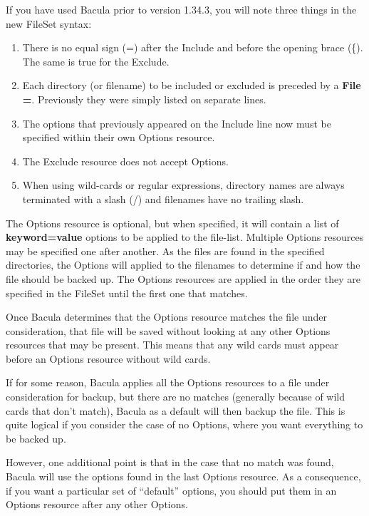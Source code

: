 If you have used Bacula prior to version 1.34.3, you will note three things in
the new FileSet syntax: 

\begin{enumerate}
\item There is no equal sign (=) after the Include and before the opening
   brace (\{). The same is true for the Exclude. 
\item Each directory (or filename) to be included or excluded is preceded by a {\bf File
   =}.  Previously they were simply listed on separate lines. 
\item The options that previously appeared on the Include line now must be
   specified within their own Options resource.
\item The Exclude resource does not accept Options. 
\item When using wild-cards or regular expressions, directory names are
   always terminated with a slash (/) and filenames have no trailing slash.
\end{enumerate}

The Options resource is optional, but when specified, it will contain a
list of {\bf keyword=value} options to be applied to the file-list.
Multiple Options resources may be specified one after another.  As the
files are found in the specified directories, the Options will applied to
the filenames to determine if and how the file should be backed up.  The
Options resources are applied in the order they are specified in the
FileSet until the first one that matches.  

Once Bacula determines that the Options resource matches the file under
consideration, that file will be saved without looking at any other Options
resources that may be present.  This means that any wild cards must appear
before an Options resource without wild cards.

If for some reason, Bacula applies all the Options resources to a file
under consideration for backup, but there are no matches (generally because
of wild cards that don't match), Bacula as a default will then backup the
file.  This is quite logical if you consider the case of no Options, where
you want everything to be backed up.  

However, one additional point is that
in the case that no match was found, Bacula will use the options found in
the last Options resource.  As a consequence, if you want a particular set
of ``default'' options, you should put them in an Options resource after
any other Options.

